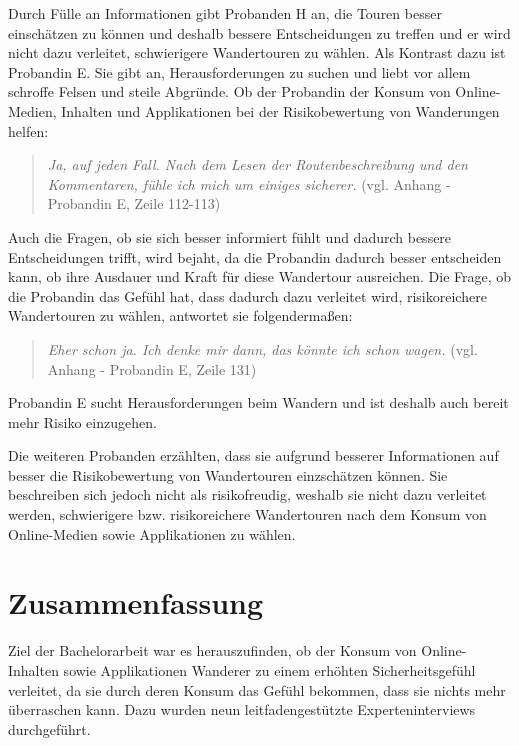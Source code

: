 Durch Fülle an Informationen gibt Probanden H an, die Touren besser einschätzen zu können und deshalb bessere Entscheidungen zu treffen und er wird nicht dazu verleitet, schwierigere Wandertouren zu wählen. Als Kontrast dazu ist Probandin E. Sie gibt an, Herausforderungen zu suchen und liebt vor allem schroffe Felsen und steile Abgründe. Ob der Probandin der Konsum von Online-Medien, Inhalten und Applikationen bei der Risikobewertung von Wanderungen helfen:

\begin{quote}
	\textit{\glqq Ja, auf jeden Fall. Nach dem Lesen der Routenbeschreibung und den Kommentaren, fühle ich mich um einiges sicherer.\grqq} (vgl. Anhang - Probandin E, Zeile 112-113)
\end{quote}

Auch die Fragen, ob sie sich besser informiert fühlt und dadurch bessere Entscheidungen trifft, wird bejaht, da die Probandin dadurch besser entscheiden kann, ob ihre Ausdauer und Kraft für diese Wandertour ausreichen. Die Frage, ob die Probandin das Gefühl hat, dass dadurch dazu verleitet wird, risikoreichere Wandertouren zu wählen, antwortet sie folgendermaßen:

\begin{quote}
	\textit{\glqq Eher schon ja. Ich denke mir dann, das könnte ich schon wagen.\grqq} (vgl. Anhang - Probandin E, Zeile 131)
\end{quote}

Probandin E sucht Herausforderungen beim Wandern und ist deshalb auch bereit mehr Risiko einzugehen.

Die weiteren Probanden erzählten, dass sie aufgrund besserer Informationen auf besser die Risikobewertung von Wandertouren einzschätzen können. Sie beschreiben sich jedoch nicht als risikofreudig, weshalb sie nicht dazu verleitet werden, schwierigere bzw. risikoreichere Wandertouren nach dem Konsum von Online-Medien sowie Applikationen zu wählen.





\chapter{Zusammenfassung}

Ziel der Bachelorarbeit war es herauszufinden, ob der Konsum von Online-Inhalten sowie Applikationen Wanderer zu einem erhöhten Sicherheitsgefühl verleitet, da sie durch deren Konsum das Gefühl bekommen, dass sie nichts mehr überraschen kann. Dazu wurden neun leitfadengestützte Experteninterviews durchgeführt.

